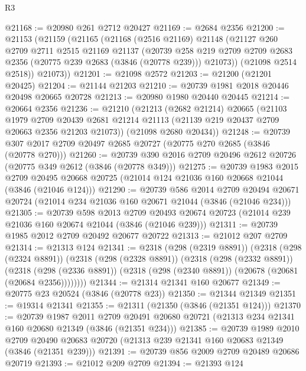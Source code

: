 \begin{lexlean}{R3}
\begin{coremodule}
@21168 := @20980 @261 @2712 @20427
@21169 := @2684 @2356
@21200 := @21153
    (@21159
      (@21165
        (@21168
          (@2516 @21169)
          @21148
          (@21127
            @260
            @2709
            @2711
            @2515
            @21169
            @21137
            (@20739
              @258
              @219
              @2709
              @2709
              @2683
              @2356
              (@20775 @239 @2683 (@3846 (@20778 @239)))
              @21073))
          (@21098 @2514 @2518))
        @21073))
@21201 := @21098 @2572
@21203 := @21200 (@21201 @20425)
@21204 := @21144 @21203
@21210 := @20739 @1981 @2018 @20446 @20498 @20665 @20728
@21213 := @20980 @1980 @20440 @20445
@21214 := @20664 @2356
@21236 := @21210
    (@21213
      (@2682 @21214)
      @20665
      (@21103
        @1979
        @2709
        @20439
        @2681
        @21214
        @21113
        (@21139 @219 @20437 @2709 @20663 @2356 @21203 @21073))
      (@21098 @2680 @20434))
@21248 := @20739 @307 @2017 @2709 @20497 @2685 @20727 (@20775 @270 @2685 (@3846 (@20778 @270)))
@21260 := @20739 @390 @2016 @2709 @20496 @2612 @20726 (@20775 @349 @2612 (@3846 (@20778 @349)))
@21275 := @20739
    @1983
    @2015
    @2709
    @20495
    @20668
    @20725
    (@21014 @124 @21036 @160 @20668 @21044 (@3846 (@21046 @124)))
@21290 := @20739
    @586
    @2014
    @2709
    @20494
    @20671
    @20724
    (@21014 @234 @21036 @160 @20671 @21044 (@3846 (@21046 @234)))
@21305 := @20739
    @598
    @2013
    @2709
    @20493
    @20674
    @20723
    (@21014 @239 @21036 @160 @20674 @21044 (@3846 (@21046 @239)))
@21311 := @20739 @1985 @2012 @2709 @20492 @20677 @20722
@21313 := @21012 @207 @2709
@21314 := @21313 @124
@21341 := @2318
    (@298 (@2319 @8891))
    (@2318
      (@298 (@2324 @8891))
      (@2318
        (@298 (@2328 @8891))
        (@2318
          (@298 (@2332 @8891))
          (@2318
            (@298 (@2336 @8891))
            (@2318 (@298 (@2340 @8891)) (@20678 (@20681 (@20684 @2356))))))))
@21344 := @21314 @21341 @160 @20677
@21349 := @20775 @23 @20524 (@3846 (@20778 @23))
@21350 := @21344 @21349
@21351 := @19314 @21341
@21355 := @21311 (@21350 (@3846 (@21351 @124)))
@21370 := @20739
    @1987
    @2011
    @2709
    @20491
    @20680
    @20721
    (@21313 @234 @21341 @160 @20680 @21349 (@3846 (@21351 @234)))
@21385 := @20739
    @1989
    @2010
    @2709
    @20490
    @20683
    @20720
    (@21313 @239 @21341 @160 @20683 @21349 (@3846 (@21351 @239)))
@21391 := @20739 @856 @2009 @2709 @20489 @20686 @20719
@21393 := @21012 @209 @2709
@21394 := @21393 @124

\end{coremodule}
\end{lexlean}
